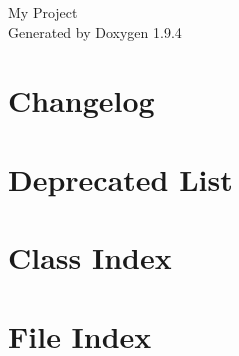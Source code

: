 \documentclass[twoside]{book}
\newcommand{\+}{\discretionary{\mbox{\scriptsize$\hookleftarrow$}}{}{}}
\newcommand{\clearemptydoublepage}{%
    \newpage{\pagestyle{empty}\cleardoublepage}%
  }
\begin{document}
  \raggedbottom
    \hypersetup{pageanchor=false,
                bookmarksnumbered=true,
                pdfencoding=unicode
               }
  \begin{titlepage}
  \vspace*{7cm}
  \begin{center}%
  {\Large My Project}\\
  \vspace*{1cm}
  {\large Generated by Doxygen 1.9.4}\\
  \end{center}
  \end{titlepage}
  \clearemptydoublepage
  \tableofcontents
  \clearemptydoublepage
  \hypersetup{pageanchor=true}
\chapter{Changelog}
\label{md_CHANGELOG}

\chapter{Deprecated List}
\label{deprecated}

\chapter{Class Index}

\chapter{File Index}

\end{document}
